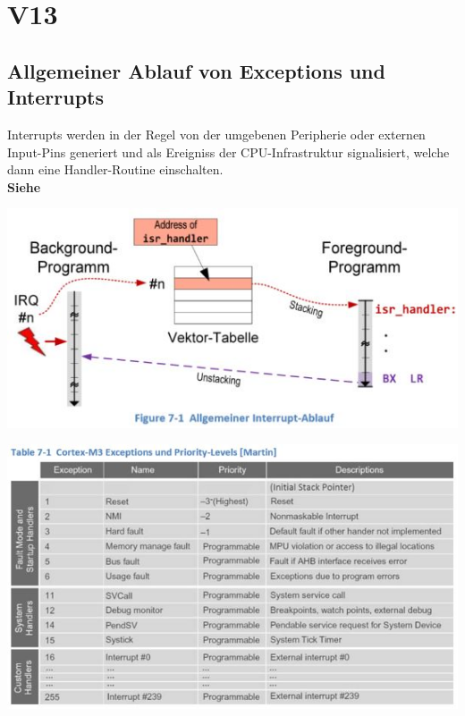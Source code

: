 \section{V13}
\subsection{Allgemeiner Ablauf von Exceptions und Interrupts}
\begin{minipage}{0.4\linewidth}
Interrupts werden in der Regel von der umgebenen Peripherie oder externen Input-Pins generiert und als Ereigniss der CPU-Infrastruktur signalisiert, welche dann eine Handler-Routine einschalten.\\
\textbf{Siehe} 
\end{minipage}
\begin{minipage}{0.6\linewidth}
\includegraphics[width=\linewidth]{images/interruptablauf} 
\end{minipage}
\includegraphics[width=0.8\linewidth]{images/NVICExcp1} 